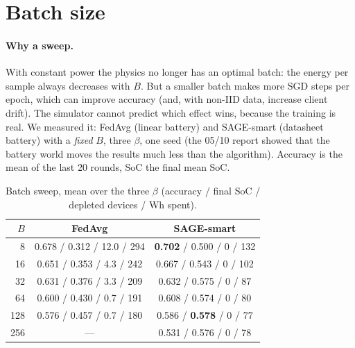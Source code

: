 \documentclass[11pt,a4paper]{article}
\begin{document}
\section{Batch size}
\label{sec:batch}

\paragraph{Why a sweep.} With constant power the physics no longer has an
optimal batch: the energy per sample always decreases with $B$. But a smaller
batch makes more SGD steps per epoch, which can improve accuracy (and, with
non-IID data, increase client drift). The simulator cannot predict which
effect wins, because the training is real. We measured it: FedAvg (linear
battery) and SAGE-smart (datasheet battery) with a \emph{fixed} $B$, three
$\beta$, one seed (the 05/10 report showed that the battery world moves the
results much less than the algorithm).
Accuracy is the mean of the last 20 rounds, SoC the final mean SoC.

\begin{table}[H]
\centering
\caption{Batch sweep, mean over the three $\beta$ (accuracy / final SoC /
depleted devices / Wh spent).}
\label{tab:sweep}
\begin{tabular}{rcc}
\toprule
$B$ & FedAvg & SAGE-smart \\
\midrule
8   & 0.678 / 0.312 / 12.0 / 294 & \textbf{0.702} / 0.500 / 0 / 132 \\
16  & 0.651 / 0.353 / 4.3 / 242  & 0.667 / 0.543 / 0 / 102 \\
32  & 0.631 / 0.376 / 3.3 / 209  & 0.632 / 0.575 / 0 / 87 \\
64  & 0.600 / 0.430 / 0.7 / 191  & 0.608 / 0.574 / 0 / 80 \\
128 & 0.576 / 0.457 / 0.7 / 180  & 0.586 / \textbf{0.578} / 0 / 77 \\
256 & ---                        & 0.531 / 0.576 / 0 / 78 \\
\bottomrule
\end{tabular}
\end{table}
\end{document}

